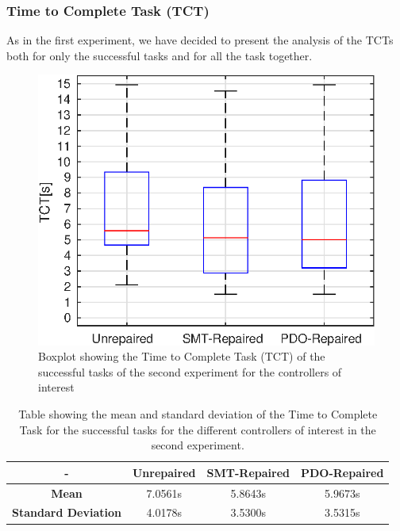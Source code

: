 \subsubsection{Time to Complete Task (TCT)}\label{subsub:second-TCT}
As in the first experiment, we have decided to present the analysis of the TCTs both for only the successful tasks and for all the task together.
\begin{figure}[H]
    \centering
    \includegraphics[width=\textwidth]{Images/second-experiment/exp1_TCT_succ.eps}
    \caption{Boxplot showing the Time to Complete Task (TCT) of the successful tasks of the second experiment for the controllers of interest}
    \label{fig:box-TCT-succ-second}
\end{figure}
\begin{table}[H]
    \centering
    \begin{tabular}{|c|c|c|c|}
        \hline
        - & \textbf{Unrepaired} & \textbf{SMT-Repaired} & \textbf{PDO-Repaired} \\
        \hline
        \textbf{Mean} & 7.0561s & 5.8643s & 5.9673s \\
        \textbf{Standard Deviation} & 4.0178s & 3.5300s & 3.5315s \\
        \hline
    \end{tabular}
    \caption{Table showing the mean and standard deviation of the Time to Complete Task for the successful tasks for the different controllers of interest in the second experiment.}
    \label{tab:TCT-succ-second-mean-std}
\end{table}
